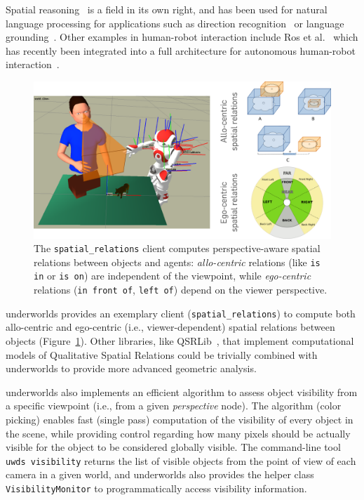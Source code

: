 \documentclass[letterpaper, 10pt, conference]{ieeeconf}
\newcommand{\etal}{et al.\xspace}
\newcommand{\ie}{i.e.,\xspace}
\newcommand{\uwds}{{\sc underworlds}\xspace}
\begin{document}
Spatial reasoning~\cite{O'Keefe1999} is a field in its own right, and has been
used for natural language processing for applications such as direction
recognition~\cite{Kollar2010,Matuszek2010} or language
grounding~\cite{Tellex2010}. Other examples in human-robot interaction include Ros
\etal~\cite{ros2010solving, ros2010which} which has recently been integrated
into a full architecture for autonomous human-robot
interaction~\cite{lemaignan2016artificial}.

\begin{figure}
    \centering
    \includegraphics[width=\linewidth]{spatialrelations}
    \caption{The {\tt spatial\_relations} client computes perspective-aware
    spatial relations between objects and agents: \emph{allo-centric} relations (like
    {\tt is in} or {\tt is on}) are independent of the viewpoint, while
    \emph{ego-centric} relations ({\tt in front of}, {\tt left of}) depend on
    the viewer perspective.}
    \label{fig|spatialrelations}
\end{figure}

\uwds provides an exemplary client ({\tt spatial\_relations}) to compute both
allo-centric and ego-centric (\ie viewer-dependent) spatial relations
between objects (Figure~\ref{fig|spatialrelations}).
Other libraries, like QSRLib~\cite{gatsoulis2016qsrlib}, that implement
computational models of Qualitative Spatial Relations could be trivially
combined with \uwds to provide more advanced geometric analysis.


\uwds also implements an efficient algorithm to assess object visibility from a
specific viewpoint (\ie from a given \emph{perspective} node). The algorithm (color
picking) enables fast (single pass) computation of the visibility of every
object in the scene, while providing control regarding how many pixels should be actually
visible for the object to be considered globally visible. The
command-line tool {\tt uwds visibility} returns the list of visible objects from
the point of view of each camera in a given world, and \uwds also provides the
helper class {\tt VisibilityMonitor} to programmatically access visibility
information.
\end{document}
